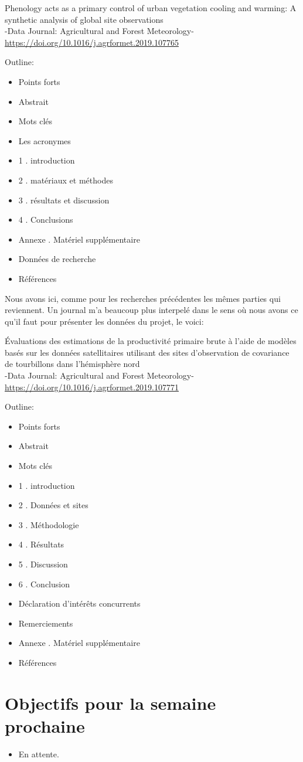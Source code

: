 \documentclass[11pt,oneside]{article}
\begin{document}
\begin{center}
Phenology acts as a primary control of urban vegetation cooling and warming: A synthetic analysis of global site observations
\\
-Data Journal: Agricultural and Forest Meteorology-\\
\url {https://doi.org/10.1016/j.agrformet.2019.107765}
\end{center}

\noindent Outline:
\begin{itemize}
\item Points forts
\item Abstrait
\item Mots clés
\item Les acronymes
\item 1 . introduction
\item 2 . matériaux et méthodes
\item 3 . résultats et discussion
\item 4 . Conclusions
\item Annexe . Matériel supplémentaire
\item Données de recherche
\item Références
\end{itemize}

Nous avons ici, comme pour les recherches précédentes les mêmes parties qui reviennent.
\newpage
\onecolumn
Un journal m'a beaucoup plus interpelé dans le sens où nous avons ce qu'il faut pour présenter les données du projet, le voici:

\begin{center}
Évaluations des estimations de la productivité primaire brute à l'aide de modèles basés sur les données satellitaires utilisant des sites d'observation de covariance de tourbillons dans l'hémisphère nord
\\
-Data Journal: Agricultural and Forest Meteorology-\\
\url {https://doi.org/10.1016/j.agrformet.2019.107771}
\end{center}

\noindent Outline:
\begin{itemize}
\item Points forts
\item Abstrait
\item Mots clés
\item 1 . introduction
\item 2 . Données et sites
\item 3 . Méthodologie
\item 4 . Résultats
\item 5 . Discussion
\item 6 . Conclusion
\item Déclaration d'intérêts concurrents
\item Remerciements
\item Annexe . Matériel supplémentaire
\item Références
\end{itemize}

\part*{Objectifs pour la semaine prochaine}
\begin{itemize}
	\item En attente.
	

\end{itemize}
\end{document}
